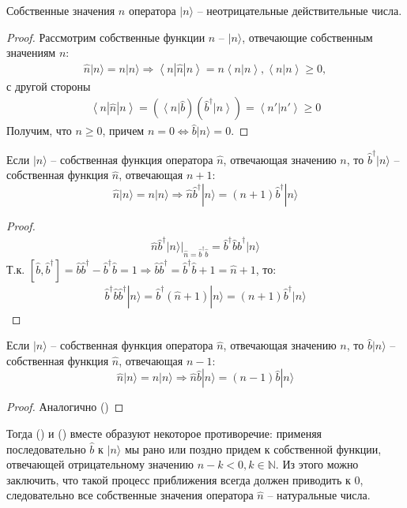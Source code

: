 \documentclass[__main__.tex]{subfiles}
\begin{document}
\begin{theorem}
	Собственные значения $n$ оператора $|n\rangle$ -- неотрицательные действительные числа.
\end{theorem}
\begin{proof}
	Рассмотрим собственные функции $\hat{n}$ -- $|n\rangle$, отвечающие собственным значениям $n$:
	\begin{gather*}
		\hat{n}|n\rangle = n|n\rangle
		\Longrightarrow
		\left< n| \hat{n}|n\right> = n \left<n|n\right>, \left<n|n\right> \ge 0,
	\end{gather*}
	с другой стороны
	\begin{gather*}
		\left< n| \hat{n}|n\right> = (\left< n\right|\hat{b})(\hat{b}^\dagger\left|n\right>) =
		\left< n'|n'\right> \ge 0
	\end{gather*}
	Получим, что $n\ge 0$, причем $n=0\Leftrightarrow \hat{b}|n\rangle = 0$.
\end{proof}
\begin{theorem}
	Если $|n\rangle$ -- собственная функция оператора $\hat{n}$, отвечающая значению $n$, то $\hat{b}^\dagger|n\rangle$ -- собственная функция $\hat{n}$, отвечающая $n+1$:
	$$
	\hat{n}|n\rangle=n|n\rangle\Longrightarrow\hat{n}\hat{b}^\dagger|n\rangle=(n+1)\hat{b}^\dagger|n\rangle
	$$
\end{theorem}
\begin{proof}
	\begin{gather*}
		\hat{n}\hat{b}^\dagger|n\rangle
		|_{\hat{n}=\hat{b}^\dagger\hat{b}}
		=
		\hat{b}^\dagger\hat{b}\hat{b}^\dagger|n\rangle
	\end{gather*}
	Т.к. $[\hat{b},\hat{b}^\dagger]=\hat{b}\hat{b}^\dagger-\hat{b}^\dagger\hat{b}=1\Longrightarrow\hat{b}\hat{b}^\dagger=\hat{b}^\dagger\hat{b}+1=\hat{n}+1$, то:
	\begin{gather*}
		\hat{b}^\dagger\hat{b}\hat{b}^\dagger|n\rangle
		=
		\hat{b}^\dagger(\hat{n}+1)|n\rangle
		=
		(n+1)\hat{b}^\dagger|n\rangle
	\end{gather*}
\end{proof}
\begin{theorem}
	Если $|n\rangle$ -- собственная функция оператора $\hat{n}$, отвечающая значению $n$, то $\hat{b}|n\rangle$ -- собственная функция $\hat{n}$, отвечающая $n-1$:
	$$
	\hat{n}|n\rangle=n|n\rangle\Longrightarrow\hat{n}\hat{b}|n\rangle=(n-1)\hat{b}|n\rangle
	$$
\end{theorem}
\begin{proof}
	Аналогично ()
\end{proof}
Тогда () и () вместе образуют некоторое противоречие: применяя последовательно $\hat{b}$ к $|n\rangle$ мы рано или поздно придем к собственной функции, отвечающей отрицательному значению $n-k<0,k\in\mathbb{N}$. Из этого можно заключить, что такой процесс приближения всегда должен приводить к $0$, следовательно все собственные значения оператора $\hat{n}$ -- натуральные числа.
\end{document}

